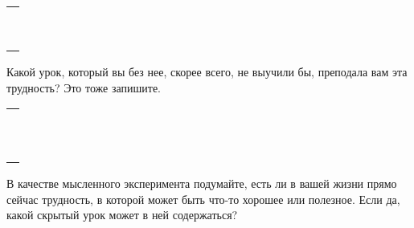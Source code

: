 \setlength{\extrarowheight}{2mm}
\begin{tabularx}{\textwidth}{X}
	\\
	\arrayrulecolor{gray}\hline\\
	\hline\\
	\hline\\
	\hline\\
	\hline\\
	\hline\\	
	\hline\\
	\hline\\
	\hline\\
	\hline\\
\end{tabularx}
\setlength{\extrarowheight}{0mm}
\begin{itemize}
	\itemWritingHand Какой урок, который вы без нее, скорее всего, не выучили бы, преподала вам эта трудность? Это тоже запишите.
\end{itemize}

\setlength{\extrarowheight}{2mm}
\begin{tabularx}{\textwidth}{X}
	\\
	\arrayrulecolor{gray}\hline\\
	\hline\\
	\hline\\
	\hline\\
	\hline\\
	\hline\\	
	\hline\\
	\hline\\
	\hline\\
	\hline\\
	\hline\\
	\hline\\
\end{tabularx}
\setlength{\extrarowheight}{0mm}
\begin{itemize}
	\itemWritingHand В качестве мысленного эксперимента подумайте, есть ли в вашей жизни  прямо сейчас трудность, в которой может быть что-то хорошее или полезное. Если да, какой скрытый урок может в ней содержаться?
\end{itemize}

